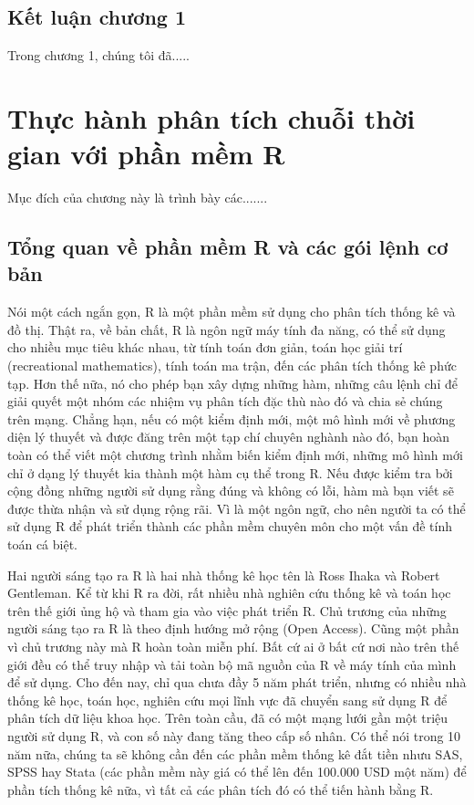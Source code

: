 \documentclass[12pt, a4paper,oneside]{book}
\theoremstyle{definition}
\begin{document}
\section*{Kết luận chương 1}
Trong chương 1, chúng tôi đã.....

\chapter{Thực hành phân tích chuỗi thời gian với phần mềm R}

Mục đích của chương này là trình bày các.......
\section{Tổng quan về phần mềm R và các gói lệnh cơ bản}

Nói một cách ngắn gọn, R là một phần mềm sử dụng cho phân tích thống kê và đồ thị. Thật ra, về bản chất, R là ngôn ngữ máy tính đa năng, có thể sử dụng cho nhiều mục tiêu khác nhau, từ tính toán đơn giản, toán học giải trí (recreational mathematics), tính toán ma trận, đến các phân tích thống kê phức tạp. Hơn thế nữa, nó cho phép bạn xây dựng những hàm, những câu lệnh chỉ để giải quyết một nhóm các nhiệm vụ phân tích đặc thù nào đó và chia sẻ chúng trên mạng. Chẳng hạn, nếu có một kiểm định mới, một mô hình mới về phương diện lý thuyết và được đăng trên một tạp chí chuyên nghành nào đó, bạn hoàn toàn có thể viết một chương trình nhằm biến kiểm định mới, những mô hình mới chỉ ở dạng lý thuyết kia thành một hàm cụ thể trong R. Nếu được kiểm tra bởi cộng đồng những người sử dụng rằng đúng và không có lỗi, hàm mà bạn viết sẽ được thừa nhận và sử dụng rộng rãi. Vì là một ngôn ngữ, cho nên người ta có thể sử dụng R để phát triển thành các phần mềm chuyên môn cho một vấn đề tính toán cá biệt.

Hai người sáng tạo ra R là hai nhà thống kê học tên là Ross Ihaka và Robert Gentleman. Kể từ khi R ra đời, rất nhiều nhà nghiên cứu thống kê và toán học trên thế giới ủng hộ và tham gia vào việc phát triển R. Chủ trương của những người sáng tạo ra R là theo định hướng mở rộng (Open Access). Cũng một phần vì chủ trương này mà R hoàn toàn miễn phí. Bất cứ ai ở bất cứ nơi nào trên thế giới đều có thể truy nhập và tải toàn bộ mã nguồn của R về máy tính của mình để sử dụng. Cho đến nay, chỉ qua chưa đầy 5 năm phát triển, nhưng có nhiều nhà thống kê học, toán học, nghiên cứu mọi lĩnh vực đã chuyển sang sử dụng R để phân tích dữ liệu khoa học. Trên toàn cầu, đã có một mạng lưới gần một triệu người sử dụng R, và con số này đang tăng theo cấp số nhân. Có thể nói trong 10 năm nữa, chúng ta sẽ không cần đến các phần mềm thống kê đắt tiền nhưu SAS, SPSS hay Stata (các phần mềm này giá có thể lên đến 100.000 USD một năm) để phần tích thống kê nữa, vì tất cả các phân tích đó có thể tiến hành bằng R.
\end{document}
